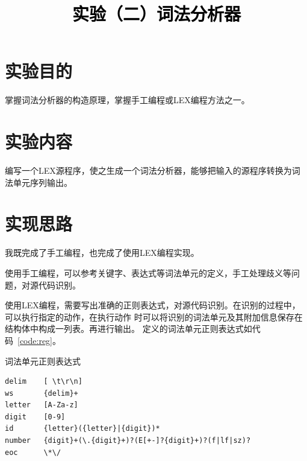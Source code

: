 \documentclass[a4paper,twoside]{article}
\newcommand{\PaperTitle}{实验（二）词法分析器}  %
\begin{document}
\newpage

\title{
	\Large{\textcolor{black}{\PaperTitle}}
}
	
	
\maketitle
	
\tableofcontents
 
\newpage
\setcounter{page}{1}

\begin{spacing}{1.2}

\section{实验目的}

掌握词法分析器的构造原理，掌握手工编程或LEX编程方法之一。

\section{实验内容}

编写一个LEX源程序，使之生成一个词法分析器，能够把输入的源程序转换为词法单元序列输出。

\section{实现思路}

我既完成了手工编程，也完成了使用LEX编程实现。

使用手工编程，可以参考关键字、表达式等词法单元的定义，手工处理歧义等问题，对源代码识别。

使用LEX编程，需要写出准确的正则表达式，对源代码识别。在识别的过程中，可以执行指定的动作，在执行动作
时可以将识别的词法单元及其附加信息保存在结构体中构成一列表。再进行输出。
定义的词法单元正则表达式如代码~\ref{code:reg}。

\begin{listing}[htb]
	\caption{词法单元正则表达式}
	\label{code:reg}
	\begin{verbatim}
delim    [ \t\r\n]
ws       {delim}+
letter   [A-Za-z]
digit    [0-9]
id       {letter}({letter}|{digit})*
number   {digit}+(\.{digit}+)?(E[+-]?{digit}+)?(f|lf|sz)?
eoc      \*\/
	\end{verbatim}
\end{listing}


\end{spacing}
\end{document}
